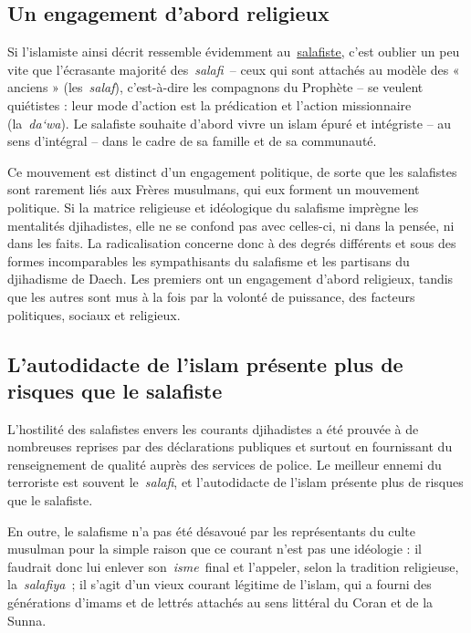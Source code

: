 \subsection{Un engagement d'abord religieux}

Si l'islamiste ainsi décrit ressemble évidemment
au~\href{https://www.la-croix.com/Religion/Islam/Quest-salafisme-2018-10-14-1200975866}{\underline{salafiste}},
c'est oublier un peu vite que l'écrasante majorité des~\emph{salafi~}--
ceux qui sont attachés au modèle des « anciens » (les~\emph{salaf}),
c'est-à-dire les compagnons du Prophète -- se veulent quiétistes : leur
mode d'action est la prédication et l'action missionnaire
(la~\emph{da`wa}). Le salafiste souhaite d'abord vivre un islam épuré et
intégriste -- au sens d'intégral -- dans le cadre de sa famille et de sa
communauté.

Ce mouvement est distinct d'un engagement politique, de sorte que les
salafistes sont rarement liés aux Frères musulmans, qui eux forment un
mouvement politique. Si la matrice religieuse et idéologique du
salafisme imprègne les mentalités djihadistes, elle ne se confond pas
avec celles-ci, ni dans la pensée, ni dans les faits. La radicalisation
concerne donc à des degrés différents et sous des formes incomparables
les sympathisants du salafisme et les partisans du djihadisme de Daech.
Les premiers ont un engagement d'abord religieux, tandis que les autres
sont mus à la fois par la volonté de puissance, des facteurs politiques,
sociaux et religieux.

\subsection{L'autodidacte de l'islam présente plus de risques que le
salafiste}

L'hostilité des salafistes envers les courants djihadistes a été prouvée
à de nombreuses reprises par des déclarations publiques et surtout en
fournissant du renseignement de qualité auprès des services de police.
Le meilleur ennemi du terroriste est souvent le~\emph{salafi}, et
l'autodidacte de l'islam présente plus de risques que le salafiste.

En outre, le salafisme n'a pas été désavoué par les représentants du
culte musulman pour la simple raison que ce courant n'est pas une
idéologie : il faudrait donc lui enlever son~\emph{isme}~final et
l'appeler, selon la tradition religieuse, la~\emph{salafiya~}; il s'agit
d'un vieux courant légitime de l'islam, qui a fourni des générations
d'imams et de lettrés attachés au sens littéral du Coran et de la Sunna.

